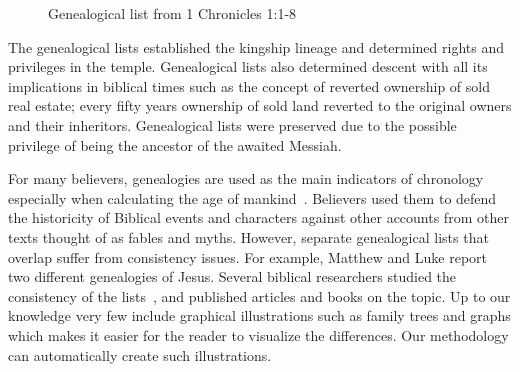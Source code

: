 \documentclass{llncs}
\begin{document}
\begin{figure}\centering
{}
\caption{Genealogical list from 1 Chronicles 1:1-8}
\end{figure}


The genealogical lists established the kingship lineage and determined
rights and privileges in the temple. Genealogical lists also determined descent with all its implications in biblical times
such as the concept of reverted ownership of sold real estate; every fifty years ownership of sold land reverted to the 
original owners and their inheritors. Genealogical lists were preserved due to the possible privilege of being the ancestor of the awaited Messiah.~\cite{catholicEncyclopedia:Online}

For many believers, genealogies are used as the main indicators of chronology especially when calculating the age of mankind~\cite{Thomas:92}.
Believers used them to defend the historicity of Biblical events and characters against other accounts from other 
texts thought of as fables and myths. 
However, separate genealogical lists that overlap suffer from consistency issues. 
For example, Matthew and Luke report two different genealogies of Jesus. 
Several biblical researchers studied the consistency of the lists~\cite{catholicEncyclopedia:Online,Belote:Online,completeBibleGenealogy:Online}, 
and published articles and books on the topic. Up to our knowledge very few include graphical illustrations such as family trees and graphs 
which makes it easier for the reader to visualize the differences. 
Our methodology can automatically create such illustrations.
\end{document}
